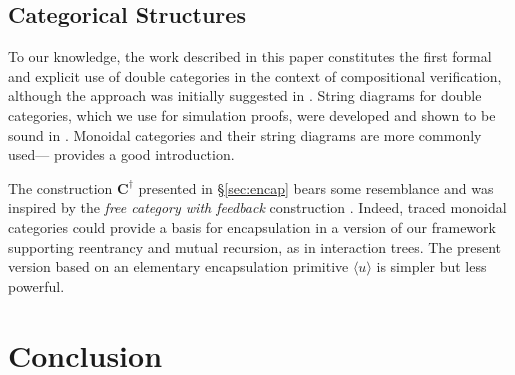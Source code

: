 \documentclass[acmsmall,screen,review,anonymous]{acmart}
\newcommand{\kw}[1]{\ensuremath{ \mathsf{#1} }}
\begin{document}
\subsection{Categorical Structures}

To our knowledge,
the work described in this paper
constitutes the first formal and explicit use of
double categories in the context of compositional verification,
although the approach was initially suggested in \citet{compcerto}.
String diagrams for double categories,
which we use for simulation proofs,
were developed and shown to be sound in \citet{dcsd}.
Monoidal categories and their string diagrams
are more commonly used---%
\citet{rosetta} provides a good introduction.

The construction $\mathbf{C}^\dagger$ presented in \S\ref{sec:encap}
bears some resemblance and was inspired by
the \emph{free category with feedback} construction \cite{feedback,caots}.
Indeed,
traced monoidal categories
could provide a basis for encapsulation
in a version of our framework supporting reentrancy and mutual recursion,
as in interaction trees.
The present version
based on an elementary encapsulation primitive $\langle u \rangle$
is simpler but less powerful.

%
%
%


\section{Conclusion} %
\end{document}
